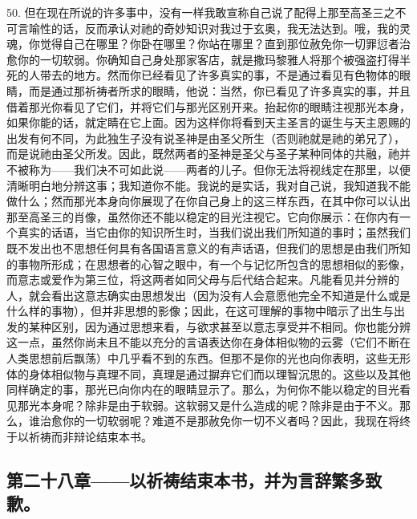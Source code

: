 50. 但在现在所说的许多事中，没有一样我敢宣称自己说了配得上那至高圣三之不可言喻性的话，反而承认对祂的奇妙知识对我过于玄奥，我无法达到。哦，我的灵魂，你觉得自己在哪里？你卧在哪里？你站在哪里？直到那位赦免你一切罪愆者治愈你的一切软弱。你确知自己身处那家客店，就是撒玛黎雅人将那个被强盗打得半死的人带去的地方。然而你已经看见了许多真实的事，不是通过看见有色物体的眼睛，而是通过那祈祷者所求的眼睛，他说：当然，你已看见了许多真实的事，并且借着那光你看见了它们，并将它们与那光区别开来。抬起你的眼睛注视那光本身，如果你能的话，就定睛在它上面。因为这样你将看到天主圣言的诞生与天主恩赐的出发有何不同，为此独生子没有说圣神是由圣父所生（否则祂就是祂的弟兄了），而是说祂由圣父所发。因此，既然两者的圣神是圣父与圣子某种同体的共融，祂并不被称为——我们决不可如此说——两者的儿子。但你无法将视线定在那里，以便清晰明白地分辨这事；我知道你不能。我说的是实话，我对自己说，我知道我不能做什么；然而那光本身向你展现了在你自己身上的这三样东西，在其中你可以认出那至高圣三的肖像，虽然你还不能以稳定的目光注视它。它向你展示：在你内有一个真实的话语，当它由你的知识所生时，当我们说出我们所知道的事时；虽然我们既不发出也不思想任何具有各国语言意义的有声话语，但我们的思想是由我们所知的事物所形成；在思想者的心智之眼中，有一个与记忆所包含的思想相似的影像，而意志或爱作为第三位，将这两者如同父母与后代结合起来。凡能看见并分辨的人，就会看出这意志确实由思想发出（因为没有人会意愿他完全不知道是什么或是什么样的事物），但并非思想的影像；因此，在这可理解的事物中暗示了出生与出发的某种区别，因为通过思想来看，与欲求甚至以意志享受并不相同。你也能分辨这一点，虽然你尚未且不能以充分的言语表达你在身体相似物的云雾（它们不断在人类思想前后飘荡）中几乎看不到的东西。但那不是你的光也向你表明，这些无形体的身体相似物与真理不同，真理是通过摒弃它们而以理智沉思的。这些以及其他同样确定的事，那光已向你内在的眼睛显示了。那么，为何你不能以稳定的目光看见那光本身呢？除非是由于软弱。这软弱又是什么造成的呢？除非是由于不义。那么，谁治愈你的一切软弱呢？难道不是那赦免你一切不义者吗？因此，我现在将终于以祈祷而非辩论结束本书。\par


\subsection{第二十八章——以祈祷结束本书，并为言辞繁多致歉。}

